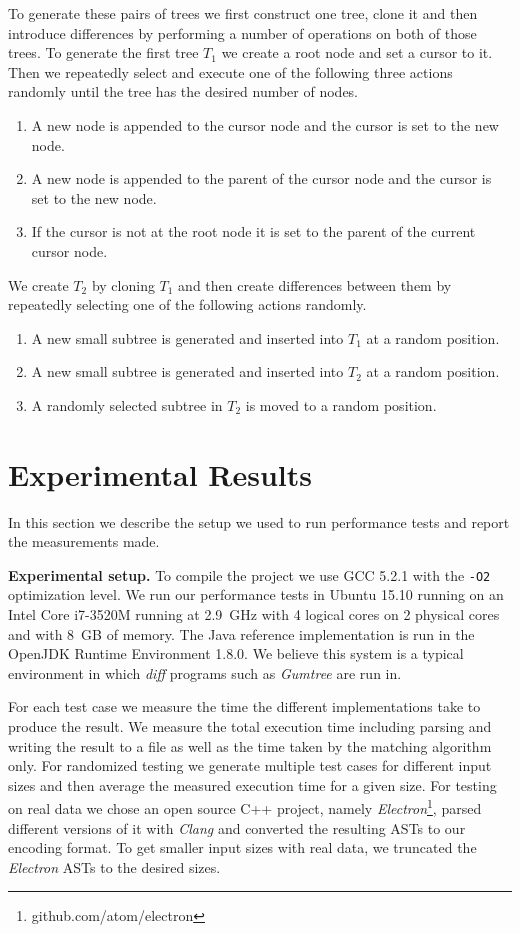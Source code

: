 \documentclass[letterpaper]{article}
\newcommand{\mypar}[1]{{\bf #1.}}
\begin{document}
To generate these pairs of trees we first construct one tree, clone it and then introduce differences by performing a number of operations on both of those trees.
To generate the first tree $T_1$ we create a root node and set a cursor to it.
Then we repeatedly select and execute one of the following three actions randomly until the tree has the desired number of nodes.
\begin{enumerate}
	\item A new node is appended to the cursor node and the cursor is set to the new node.
	\item A new node is appended to the parent of the cursor node and the cursor is set to the new node.
	\item If the cursor is not at the root node it is set to the parent of the current cursor node.
\end{enumerate}
We create $T_2$ by cloning $T_1$ and then create differences between them by repeatedly selecting one of the following actions randomly.
\begin{enumerate}
	\item A new small subtree is generated and inserted into $T_1$ at a random position.
	\item A new small subtree is generated and inserted into $T_2$ at a random position.
	\item A randomly selected subtree in $T_2$ is moved to a random position.
\end{enumerate}

\section{Experimental Results}\label{sec:exp}

In this section we describe the setup we used to run performance tests and report the measurements made.

\mypar{Experimental setup}
To compile the project we use GCC 5.2.1 with the \texttt{-O2} optimization level.
We run our performance tests in Ubuntu 15.10 running on an Intel Core i7-3520M running at 2.9~GHz with 4 logical cores on 2 physical cores and with 8~GB of memory.
The Java reference implementation is run in the OpenJDK Runtime Environment 1.8.0.
We believe this system is a typical environment in which \emph{diff} programs such as \emph{Gumtree} are run in.

For each test case we measure the time the different implementations take to produce the result.
We measure the total execution time including parsing and writing the result to a file as well as the time taken by the matching algorithm only.
For randomized testing we generate multiple test cases for different input sizes and then average the measured execution time for a given size.
For testing on real data we chose an open source C++ project, namely \emph{Electron}\footnote{github.com/atom/electron}, parsed different versions of it with \emph{Clang} and converted the resulting ASTs to our encoding format.
To get smaller input sizes with real data, we truncated the \emph{Electron} ASTs to the desired sizes.
\end{document}
